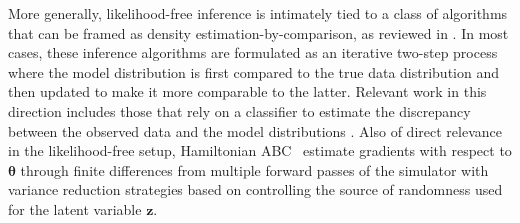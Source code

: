\documentclass[twocolumn,superscriptaddress,aps]{revtex4-1}
\newcommand{\kcnote}[1]{\textcolor{red}{[KC: #1]}}
\newcommand{\bftheta}{{\bm \theta}}
\newcommand{\bfpsi}{{\bm \psi}}
\newcommand{\bfx}{\mathbf{x}}
\newcommand{\bfz}{\mathbf{z}}
\theoremstyle{plain}
\begin{document}


More generally, likelihood-free
inference is intimately tied to a class of algorithms that can be framed as
density estimation-by-comparison, as reviewed in \cite{2016arXiv161003483M}. In most cases, these
inference algorithms are formulated as an iterative two-step process where the
model distribution is first compared to the true data distribution and then
updated to make it more comparable to the latter. Relevant work in this
direction includes those that rely on a classifier to estimate the discrepancy between the observed data and the model distributions
\citep{gutmann2012noise,cranmer2015approximating,cranmer2016experiments,2016arXiv161110242D,gutmann2017likelihood,rosca2017variational}.
Also of direct relevance in the likelihood-free setup, Hamiltonian ABC~\citep{meeds2015hamiltonian}
estimate gradients with respect
to $\bftheta$ through finite differences from multiple forward passes of the
simulator with variance reduction strategies based on controlling the source of
randomness used for the latent variable $\bfz$.
\end{document}
